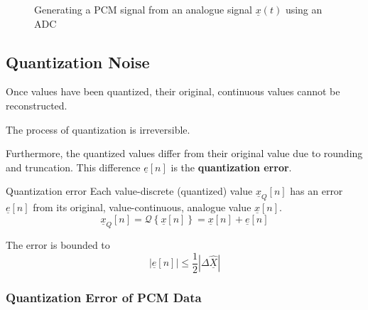 \begin{refsection}
\begin{figure}[H]
\begin{adjustbox}{scale=0.8}
	\end{adjustbox}
	\caption[Generating a PCM signal from an analogue signal $\underline{x}(t)$ using an ADC]{Generating a \ac{PCM} signal from an analogue signal $\underline{x}(t)$ using an \ac{ADC}}
	\label{fig:ch04:signals_to_data}
\end{figure}

\subsection{Quantization Noise}

Once values have been quantized, their original, continuous values cannot be reconstructed.

\begin{fact}
	The process of quantization is irreversible.
\end{fact}

Furthermore, the quantized values differ from their original value due to rounding and truncation. This difference $\underline{e}[n]$ is the  \textbf{quantization error}.

\begin{definition}{Quantization error}
	Each value-discrete (quantized) value $\underline{x}_Q[n]$ has an error $\underline{e}[n]$ from its original, value-continuous, analogue value $\underline{x}[n]$.
	\begin{equation}
		\underline{x}_Q[n] = \mathcal{Q}\left\{\underline{x}[n]\right\} = \underline{x}[n] + \underline{e}[n]
	\end{equation}
	
	The error is bounded to
	\begin{equation}
		\left|\underline{e}[n]\right| \leq \frac{1}{2} \left|\Delta \underline{\hat{X}}\right|
	\end{equation}
\end{definition}

\subsubsection{Quantization Error of PCM Data}


\end{refsection}
